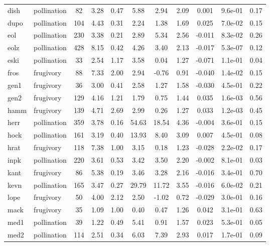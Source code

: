 \begin{table}[]
{\begin{tabular}{@{}llccccccccc@{}}
dish \cite{dihi} & pollination & 82 & 3.28 & 0.47 & 5.88 & 2.94 & 2.09 & 0.001 & 9.6e-01 & 0.17 \\
dupo \cite{dupo} & pollination & 104 & 4.43 & 0.31 & 2.24 & 1.38 & 1.69 & 0.025 & 7.0e-02 & 0.15 \\
eol  \cite{eol}  & pollination & 230 & 3.38 & 0.21 & 2.89 & 5.34 & 2.56 & -0.011 & 8.3e-02 & 0.26 \\
eolz \cite{eolz} & pollination & 428 & 8.15 & 0.42 & 4.26 & 3.40 & 2.13 & -0.017 & 5.3e-07 & 0.12 \\
eski \cite{eski} & pollination & 33 & 2.54 & 1.17 & 3.58 & 0.04 & 1.27 & -0.071 & 1.1e-01 & 0.04 \\
fros \cite{fros} & frugivory & 88 & 7.33 & 2.00 & 2.94 & -0.76 & 0.91 & -0.040 & 1.4e-02 & 0.15 \\
gen1 \cite{gen1} & frugivory & 36 & 3.00 & 0.41 & 2.58 & 1.27 & 1.58 & -0.030 & 4.5e-01 & 0.22 \\
gen2 \cite{gen1} & frugivory & 129 & 4.16 & 1.21 & 1.79 & 0.75 & 1.44 & 0.035 & 1.6e-03 & 0.56 \\
hamm \cite{hamm} & frugivory & 139 & 4.71 & 2.69 & 2.99 & 0.26 & 1.27 & 0.033 & 1.2e-03 & 0.45 \\
herr \cite{herr} & pollination & 359 & 3.78 & 0.16 & 54.63 & 18.54 & 4.36 & -0.004 & 3.6e-01 & 0.15 \\
hock \cite{hock} & pollination & 161 & 3.19 & 0.40 & 13.93 & 8.40 & 3.09 & 0.007 & 4.5e-01 & 0.08 \\
hrat \cite{hrat} & frugivory & 118 & 7.38 & 1.00 & 3.15 & 0.18 & 1.23 & -0.028 & 2.2e-02 & 0.17 \\
inpk \cite{inpk} & pollination & 220 & 3.61 & 0.53 & 3.42 & 3.50 & 2.20 & -0.002 & 8.1e-01 & 0.03 \\
kant \cite{kant} & frugivory & 86 & 5.38 & 0.19 & 3.46 & 3.28 & 2.16 & -0.016 & 3.4e-01 & 0.70 \\
kevn \cite{kevn} & pollination & 165 & 3.47 & 0.27 & 29.79 & 11.72 & 3.55 & -0.016 & 6.0e-02 & 0.21 \\
lope \cite{lope} & frugivory & 50 & 4.00 & 2.12 & 2.50 & -1.02 & 0.72 & -0.029 & 3.0e-01 & 0.16 \\
mack \cite{mack} & frugivory & 35 & 1.09 & 1.00 & 0.40 & 0.47 & 1.26 & 0.042 & 3.1e-01 & 0.63 \\
med1 \cite{med1} & pollination & 39 & 1.22 & 0.49 & 5.41 & 0.91 & 1.57 & 0.023 & 5.3e-01 & 0.05 \\
med2 \cite{med1} & pollination & 114 & 2.51 & 0.34 & 6.03 & 7.39 & 2.93 & 0.017 & 1.7e-01 & 0.09 \\

\end{tabular}}
\end{table}
